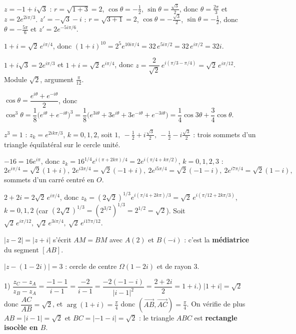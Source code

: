 $z=-1+i\sqrt3$ : $r=\sqrt{1+3}=2$, $\cos\theta=-\frac12$, $\sin\theta=\frac{\sqrt3}2$, donc
$\theta=\frac{2\pi}3$ et $z=2e^{2i\pi/3}$.\;
$z'=-\sqrt3-i$ : $r=\sqrt{3+1}=2$, $\cos\theta=-\frac{\sqrt3}2$, $\sin\theta=-\frac12$, donc
$\theta=-\frac{5\pi}6$ et $z'=2e^{-5i\pi/6}$.

$1+i=\sqrt2\,e^{i\pi/4}$, donc $(1+i)^{10}=2^{5}e^{10i\pi/4}=32\,e^{5i\pi/2}=32\,e^{i\pi/2}=32i$.

$1+i\sqrt3=2e^{i\pi/3}$ et $1+i=\sqrt2\,e^{i\pi/4}$, donc
$z=\dfrac{2}{\sqrt2}\,e^{i(\pi/3-\pi/4)}=\sqrt2\,e^{i\pi/12}$. Module $\sqrt2$, argument
$\frac\pi{12}$.

$\cos\theta=\dfrac{e^{i\theta}+e^{-i\theta}}2$, donc
$\cos^{3}\theta=\dfrac18\big(e^{i\theta}+e^{-i\theta}\big)^{3}
=\dfrac18\big(e^{3i\theta}+3e^{i\theta}+3e^{-i\theta}+e^{-3i\theta}\big)
=\dfrac14\cos3\theta+\dfrac34\cos\theta$.

$z^{3}=1$ : $z_k=e^{2ik\pi/3}$, $k=0,1,2$, soit
$1,\ -\frac12+i\frac{\sqrt3}2,\ -\frac12-i\frac{\sqrt3}2$ : trois sommets d'un triangle équilatéral
sur le cercle unité.

$-16=16e^{i\pi}$, donc $z_k=16^{1/4}e^{i(\pi+2k\pi)/4}=2e^{i(\pi/4+k\pi/2)}$, $k=0,1,2,3$ :
\[
2e^{i\pi/4}=\sqrt2(1+i),\ 2e^{i3\pi/4}=\sqrt2(-1+i),\ 2e^{i5\pi/4}=\sqrt2(-1-i),\
2e^{i7\pi/4}=\sqrt2(1-i),
\]
sommets d'un carré centré en $O$.

$2+2i=2\sqrt2\,e^{i\pi/4}$, donc
$z_k=(2\sqrt2)^{1/3}e^{i(\pi/4+2k\pi)/3}=\sqrt2\,e^{i(\pi/12+2k\pi/3)}$, $k=0,1,2$ (car
$(2\sqrt2)^{1/3}=(2^{3/2})^{1/3}=2^{1/2}=\sqrt2$). Soit
$\sqrt2\,e^{i\pi/12},\ \sqrt2\,e^{3i\pi/4},\ \sqrt2\,e^{i17\pi/12}$.

$|z-2|=|z+i|$ s'écrit $AM=BM$ avec $A(2)$ et $B(-i)$ : c'est la \textbf{médiatrice} du segment
$[AB]$.

$|z-(1-2i)|=3$ : cercle de centre $\Omega(1-2i)$ et de rayon $3$.

1) $\dfrac{z_C-z_A}{z_B-z_A}=\dfrac{-1-1}{i-1}=\dfrac{-2}{i-1}=\dfrac{-2(-1-i)}{|i-1|^{2}}
=\dfrac{2+2i}{2}=1+i$.) $|1+i|=\sqrt2$ donc $\dfrac{AC}{AB}=\sqrt2$, et $\arg(1+i)=\frac\pi4$ donc
$(\overrightarrow{AB},\overrightarrow{AC})=\frac\pi4$. On vérifie de plus $AB=|i-1|=\sqrt2$ et
$BC=|{-1}-i|=\sqrt2$ : le triangle $ABC$ est \textbf{rectangle isocèle en $B$}.

